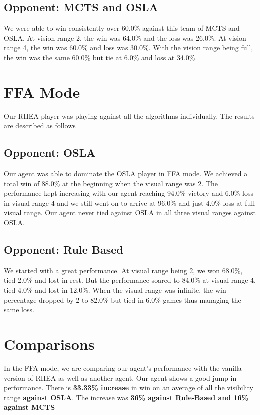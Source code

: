 \documentclass{report}
\begin{document}
\subsection{Opponent: MCTS and OSLA}
We were able to win consistently over 60.0\% against this team of MCTS and OSLA. At vision range 2, the win was 64.0\% and the loss was 26.0\%. At vision range 4, the win was 60.0\% and loss was 30.0\%. With the vision range being full, the win was the same 60.0\% but tie at 6.0\% and loss at 34.0\%.

\section{FFA Mode}
Our RHEA player was playing against all the algorithms individually. The results are described as follows

\subsection{Opponent: OSLA}
Our agent was able to dominate the OSLA player in FFA mode. We achieved a total win of 88.0\% at the beginning when the visual range was 2. The performance kept increasing with our agent reaching 94.0\% victory and 6.0\% loss in visual range 4 and we still went on to arrive at 96.0\% and just 4.0\% loss at full visual range. Our agent never tied against OSLA in all three visual ranges against OSLA.

\subsection{Opponent: Rule Based}
We started with a great performance. At visual range being 2, we won 68.0\%, tied 2.0\% and lost in rest. But the performance soared to 84.0\% at visual range 4, tied 4.0\% and lost in 12.0\%. When the visual range was infinite, the win percentage dropped by 2 to 82.0\% but tied in 6.0\% games thus managing the same loss.

\section{Comparisons}
In the FFA mode, we are comparing our agent's performance with the vanilla version of RHEA as well as another agent. Our agent shows a good jump in performance. There is \textbf{33.33\% increase} in win on an average of all the visibility range \textbf{against OSLA}. The increase was \textbf{36\% against Rule-Based and 16\% against MCTS}
\end{document}
